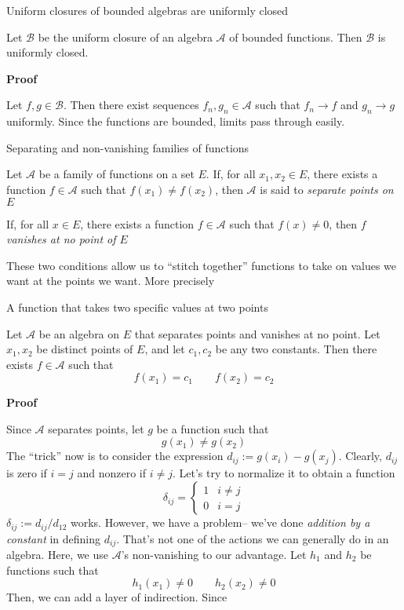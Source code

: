 \begin{theorem}Uniform closures of bounded algebras are uniformly closed

    Let $\mathscr{B}$ be the uniform closure of an algebra $\mathscr{A}$ of bounded functions. Then $\mathscr{B}$ is uniformly closed.

    \textbf{Proof}

    Let $f,g \in \mathscr{B}$. Then there exist sequences $f_n, g_n \in \mathscr{A}$ such that $f_n \to f$ and $g_n \to g$ uniformly. Since the functions are bounded, limits pass through easily.
\end{theorem}

\begin{definition}Separating and non-vanishing families of functions

    Let $\mathscr{A}$ be a family of functions on a set $E$. If, for all $x_1, x_2 \in E$, there exists a function $f \in \mathscr{A}$ such that $f(x_1) \neq f(x_2)$, then $\mathscr{A}$ is said to \textit{separate points on $E$}

    If, for all $x \in E$, there exists a function $f \in \mathscr{A}$ such that $f(x) \neq 0$, then $f$ \textit{vanishes at no point of $E$} 
\end{definition}

These two conditions allow us to ``stitch together'' functions to take on values we want at the points we want. More precisely

\begin{theorem} A function that takes two specific values at two points

    Let $\mathscr{A}$ be an algebra on $E$ that separates points and vanishes at no point. Let $x_1, x_2$ be distinct points of $E$, and let $c_1, c_2$ be any two constants. Then there exists $f \in \mathscr{A}$ such that
    \[f(x_1) = c_1 \qquad f(x_2) = c_2\]

    \textbf{Proof}

    Since $\mathscr{A}$ separates points, let $g$ be a function such that 
    \[g(x_1) \neq g(x_2)\]
    The ``trick'' now is to consider the expression $d_{ij} := g(x_i) - g(x_j)$. Clearly, $d_{ij}$ is zero if $i = j$ and nonzero if $i \neq j$. Let's try to normalize it to obtain a function 
    \[\delta_{ij} = \begin{cases}
        1 & i \neq j  \\
        0 & i = j
    \end{cases}\]
    $\delta_{ij} := d_{ij}/d_{12}$ works. However, we have a problem-- we've done \textit{addition by a constant} in defining $d_{ij}$. That's not one of the actions we can generally do in an algebra. Here, we use $\mathscr{A}$'s non-vanishing to our advantage. Let $h_1$ and $h_2$ be functions such that
    \[h_1(x_1) \neq 0 \qquad h_2(x_2) \neq 0\]
    Then, we can add a layer of indirection. Since
\end{theorem}
